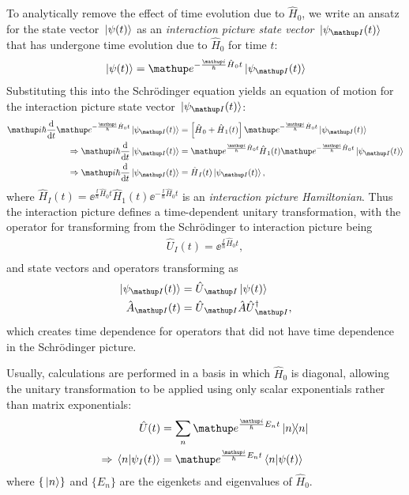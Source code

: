To analytically remove the effect of time evolution due to $\hat H_0$, we write an ansatz for the state vector $\ket{\psi(t)}$ as an \emph{interaction picture state vector} $\ket{\psi_\up{I}(t)}$ that has undergone time evolution due to $\hat H_0$ for time $t$:
\begin{align}
\ket{\psi(t)} = \ee^{-\frac\ii\hbar\hat H_0 t}\ket{\psi_\up{I}(t)}
\end{align}
Substituting this into the Schr\"odinger equation yields an equation of motion for the interaction picture state vector $\ket{\psi_\up{I}(t)}$:
\begin{align}
\ii\hbar\dv t \ee^{-\frac\ii\hbar\hat H_0 t}\ket{\psi_\up{I}(t)} &= 
\left[\hat H_0 + \hat H_1(t)\right]\ee^{-\frac\ii\hbar\hat H_0 t}\ket{\psi_\up{I}(t)}\\
\Rightarrow \ii\hbar\dv t\ket{\psi_\up{I}(t)} &=
\ee^{\frac\ii\hbar\hat H_0 t}\hat H_1(t)\ee^{-\frac\ii\hbar\hat H_0 t}\ket{\psi_\up{I}(t)}\\
\Rightarrow \ii\hbar\dv t\ket{\psi_\up{I}(t)} &= \hat H_I(t)\ket{\psi_\up{I}(t)},
\end{align}
where $\hat H_I(t)=\ee^{\frac\ii\hbar\hat H_0 t}\hat H_1(t)\ee^{-\frac\ii\hbar\hat H_0 t}$ is an \emph{interaction picture Hamiltonian}. Thus the interaction picture defines a time-dependent unitary transformation, with the operator for transforming from the Schr\"odinger to interaction picture being
\begin{align}
\hat U_I(t) = \ee^{\frac\ii\hbar\hat H_0 t},\\
\end{align}
and state vectors and operators transforming as
\begin{align}
\ket{\psi_\up{I}(t)} &= \hat U_\up{I}\ket{\psi(t)}\\
\hat A_\up{I}(t) &= \hat U_\up{I} \hat A \hat U^\dagger_\up{I},
\end{align} 
which creates time dependence for operators that did not have time dependence in the Schr\"odinger picture.

Usually, calculations are performed in a basis in which $\hat H_0$ is diagonal, allowing the unitary transformation to be applied using only scalar exponentials rather than matrix exponentials:
\begin{align}
\hat U(t) &= \sum_n \ee^{\frac\ii\hbar E_n t}\ketbra{n}{n}\\
\Rightarrow \braket{n}{\psi_I(t)} &= \ee^{\frac\ii\hbar E_n t}\braket{n}{\psi(t)}\label{eq:interaction_picture_psi_transform_diagonal}
\end{align}
where $\{\ket{n}\}$ and $\{E_n\}$ are the eigenkets and eigenvalues of $\hat H_0$.

